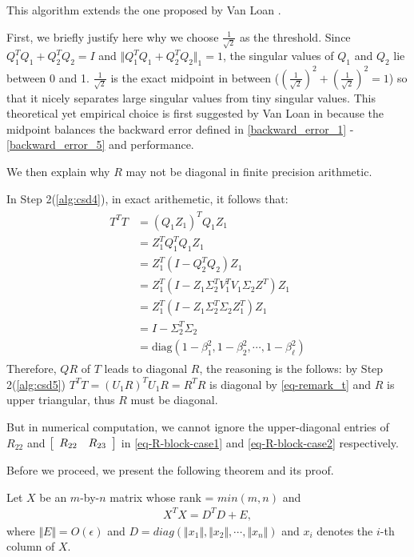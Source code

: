 \begin{remark} \label{rmk:betarank} 
{\rm  
This algorithm extends the one proposed 
by Van Loan \cite{vanloan85}.    

First, we briefly justify here why we choose $\frac{1}{\sqrt{2}}$ as the threshold. 
Since $Q_{1}^{T}Q_{1} + Q_{2}^{T}Q_{2} = I$ and 
$\Vert Q_{1}^{T}Q_{1} + Q_{2}^{T}Q_{2} \Vert_{1} = 1$, 
the singular values of $Q_{1}$ and $Q_{2}$ lie between 0 and 1. 
$\frac{1}{\sqrt{2}}$ is the exact midpoint in between 
($(\frac{1}{\sqrt{2}})^{2} + (\frac{1}{\sqrt{2}})^{2} = 1$) 
so that it nicely separates large singular values from tiny singular values. 
This theoretical yet empirical choice is first suggested 
by Van Loan in \cite{vanloan85} because the midpoint balances 
the backward error defined in 
\eqref{backward_error_1} - \eqref{backward_error_5} and performance.

We then explain why $R$ may not be diagonal in finite precision arithmetic.

In Step 2(\ref{alg:csd4}), in exact arithemetic, it follows that:
\begin{align} \label{eq-remark_t}
\begin{split}
T^{T}T &= (Q_{1}Z_{1})^{T}Q_{1}Z_{1} \\
&= Z_{1}^{T}Q_{1}^{T}Q_{1}Z_{1} \\
&= Z_{1}^{T}(I - Q_{2}^{T}Q_{2})Z_{1} \\
&= Z_{1}^{T}(I - Z_{1}\Sigma_{2}^{T}V_{1}^{T}V_{1}\Sigma_{2}Z^{T})Z_{1} \\
&= Z_{1}^{T}(I - Z_{1}\Sigma_{2}^{T}\Sigma_{2}Z_{1}^{T})Z_{1} \\
&= I - \Sigma_{2}^{T}\Sigma_{2} \\
&= \mbox{diag}(1-\beta_{1}^{2}, 1-\beta_{2}^{2}, \cdots, 1-\beta_{\ell}^{2})
\end{split}
\end{align}
Therefore, $QR$ of $T$ leads to diagonal $R$, the reasoning is the follows: by Step 2(\ref{alg:csd5}) $T^{T}T = (U_{1}R)^{T}U_{1}R = R^{T}R$ is diagonal by \eqref{eq-remark_t} and $R$ is upper triangular, thus $R$ must be diagonal. 

But in numerical computation, we cannot ignore the upper-diagonal entries of $R_{22}$ and $\left[ \begin{array}{cc} R_{22} & R_{23} \end{array} \right]$ in \eqref{eq-R-block-case1} and \eqref{eq-R-block-case2} respectively.
 
Before we proceed, we present the following theorem and its proof.

\begin{theorem}
Let $X$ be an $m$-by-$n$ matrix whose rank = $min(m, n)$ and
\begin{align*}
	X^{T}X = D^{T}D + E,
\end{align*}
where $\Vert E \Vert = O(\epsilon)$ and $D = diag(\Vert x_{1} \Vert, \Vert x_{2} \Vert, \cdots, \Vert x_{n} \Vert)$ and $x_{i}$ denotes the $i$-th column of $X$.


\end{theorem}}
\end{remark}
